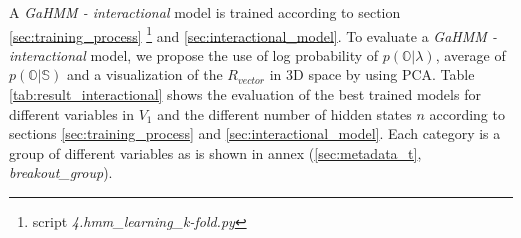 A \textit{GaHMM - interactional} model is trained according to section \ref{sec:training_process} \footnote{script \textit{4.hmm\_learning\_k-fold.py}} and \ref{sec:interactional_model}. To evaluate a \textit{GaHMM - interactional} model, we propose the use of log probability of $ p(\mathbb{O}|\lambda)$, average of $p(\mathbb{O}|\mathbb{S})$ and a visualization of the $R_{vector}$ in 3D space by using PCA. Table \ref{tab:result_interactional} shows the evaluation of the best trained models for different variables in $V_1$ and the different number of hidden states $n$ according to sections \ref{sec:training_process} and \ref{sec:interactional_model}. Each category is a group of different variables as is shown in annex (\ref{sec:metadata_t}, \textit{breakout\_group}).


